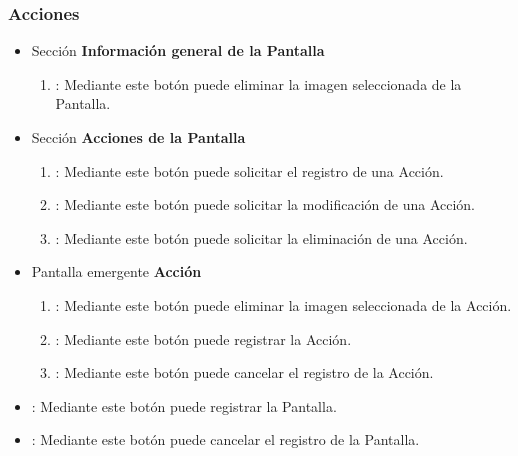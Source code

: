 \subsubsection{Acciones}
\begin{itemize}
 \item Sección \textbf{Información general de la Pantalla}
  \begin{enumerate}
	\item \btnEliminar[Eliminar]: Mediante este botón puede eliminar la imagen seleccionada de la Pantalla.
  \end{enumerate}
  \item Sección \textbf{Acciones de la Pantalla}
  \begin{enumerate}
	\item {}: Mediante este botón puede solicitar el registro de una Acción.
	\item {}: Mediante este botón puede solicitar la modificación de una Acción.
	\item {}: Mediante este botón puede solicitar la eliminación de una Acción.
  \end{enumerate}
  \item Pantalla emergente \textbf{Acción}
  \begin{enumerate}
	\item \btnEliminar[Eliminar]: Mediante este botón puede eliminar la imagen seleccionada de la Acción.
	\item {}: Mediante este botón puede registrar la Acción.
	\item {}: Mediante este botón puede cancelar el registro de la Acción.
  \end{enumerate}
 \item {}: Mediante este botón puede registrar la Pantalla.
 \item {}: Mediante este botón puede cancelar el registro de la Pantalla.
\end{itemize}
	
	
